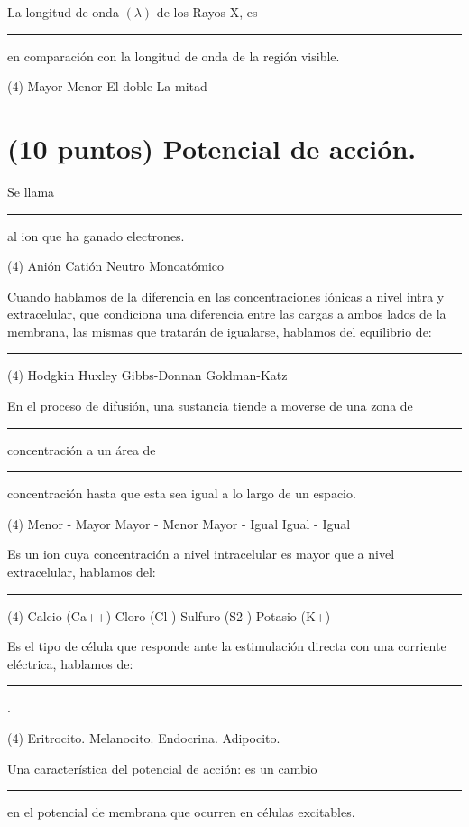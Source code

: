 \documentclass[12pt, letter]{exam}
\begin{document}
\begin{questions}
    \question La longitud de onda $(\lambda)$ de los Rayos X, es \rule{2cm}{0.1mm} en comparación con la longitud de onda de la región visible.
    \begin{tasks}(4)
        \task Mayor
        \task Menor
        \task El doble
        \task La mitad
    \end{tasks}
    

    \section{(10 puntos) Potencial de acción.}

    \question Se llama \rule{2cm}{0.1mm} al ion que ha ganado electrones.
    \begin{tasks}(4)
        \task Anión
        \task Catión
        \task Neutro
        \task Monoatómico        
    \end{tasks}
    \question Cuando hablamos de la diferencia en las concentraciones iónicas a nivel intra y extracelular, que condiciona una diferencia entre las cargas a ambos lados de la membrana, las mismas que tratarán de igualarse, hablamos del equilibrio de: \rule{2cm}{0.1mm}
    \begin{tasks}(4)
        \task Hodgkin
        \task Huxley
        \task Gibbs-Donnan
        \task Goldman-Katz
    \end{tasks}
    \question En el proceso de difusión, una sustancia tiende a moverse de una zona de \rule{2cm}{0.1mm} concentración a un área de \rule{2cm}{0.1mm} concentración hasta que esta sea igual a lo largo de un espacio.
    \begin{tasks}(4)
        \task Menor - Mayor
        \task Mayor - Menor
        \task Mayor - Igual
        \task Igual - Igual
    \end{tasks}
    \question Es un ion cuya concentración a nivel intracelular es mayor que a nivel extracelular, hablamos del: \rule{2cm}{0.1mm}
    \begin{tasks}(4)
        \task Calcio (Ca++)
        \task Cloro (Cl-)
        \task Sulfuro (S2-)
        \task Potasio (K+)
    \end{tasks}
    \question Es el tipo de célula que responde ante la estimulación directa con una corriente eléctrica, hablamos de: \rule{2cm}{0.1mm}.
    \begin{tasks}(4)
        \task Eritrocito.
        \task Melanocito.
        \task Endocrina.
        \task Adipocito.
    \end{tasks}
    \question Una característica del potencial de acción: es un cambio \rule{2cm}{0.1mm} en el potencial de membrana que ocurren en células excitables.

\end{questions}
\end{document}
